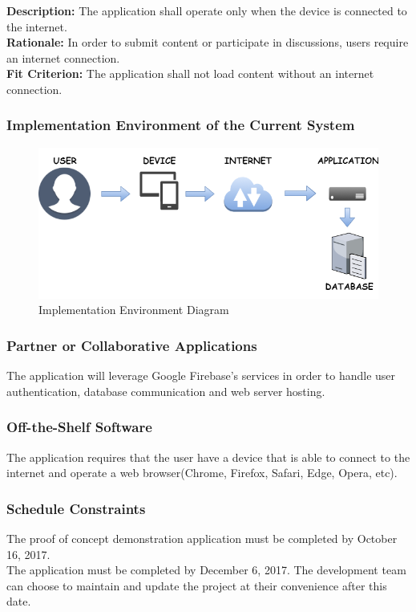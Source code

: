 \documentclass[12pt,fleqn]{article}
\begin{document}
\begin{tcolorbox}
\textbf{Description:} The application shall operate only when the device is connected to the internet.
\\
\textbf{Rationale:} In order to submit content or participate in discussions, users require an internet connection.
\\
\textbf{Fit Criterion:} The application shall not load content without an internet connection.
\end{tcolorbox}


\subsubsection {Implementation Environment of the Current System}
\begin{figure}[htp]
\centering
\includegraphics[width=16cm]{env}
\caption{Implementation Environment Diagram}
\label{fig:environment}
\end{figure}

\subsubsection {Partner or Collaborative Applications}
The application will leverage Google Firebase's services in order to handle user authentication, database communication and web server hosting.

\subsubsection {Off-the-Shelf Software}
The application requires that the user have a device that is able to connect to the internet and operate a web browser(Chrome, Firefox, Safari, Edge, Opera, etc). 

\subsubsection {Schedule Constraints}
The proof of concept demonstration application must be completed by October 16, 2017. \\
The application must be completed by December 6, 2017.  The development team can choose to maintain and update the project at their convenience after this date.
\end{document}
